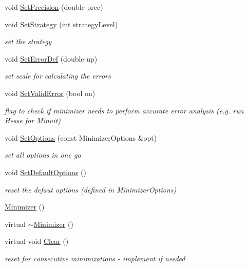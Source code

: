 \begin{DoxyCompactItemize}
void \mbox{\hyperlink{classROOT_1_1Math_1_1Minimizer_a96160fe12f3cddf6ca0668ddb4a585bc}{Set\+Precision}} (double prec)
\item 
void \mbox{\hyperlink{classROOT_1_1Math_1_1Minimizer_a86a1145e00a7912ac061bad0e11b6c0b}{Set\+Strategy}} (int strategy\+Level)
\begin{DoxyCompactList}\small\item\em set the strategy \end{DoxyCompactList}\item 
void \mbox{\hyperlink{classROOT_1_1Math_1_1Minimizer_a24e7d646b58b9d5d2778c7c0399677da}{Set\+Error\+Def}} (double up)
\begin{DoxyCompactList}\small\item\em set scale for calculating the errors \end{DoxyCompactList}\item 
void \mbox{\hyperlink{classROOT_1_1Math_1_1Minimizer_a31289e6911a86aba956d0050cee2555b}{Set\+Valid\+Error}} (bool on)
\begin{DoxyCompactList}\small\item\em flag to check if minimizer needs to perform accurate error analysis (e.\+g. run Hesse for Minuit) \end{DoxyCompactList}\item 
void \mbox{\hyperlink{classROOT_1_1Math_1_1Minimizer_ac1546eeefbfb78bcfaf6d06cfde227c5}{Set\+Options}} (const Minimizer\+Options \&opt)
\begin{DoxyCompactList}\small\item\em set all options in one go \end{DoxyCompactList}\item 
void \mbox{\hyperlink{classROOT_1_1Math_1_1Minimizer_a4811690d47537dbc0ab09d50d57ce34f}{Set\+Default\+Options}} ()
\begin{DoxyCompactList}\small\item\em reset the defaut options (defined in Minimizer\+Options) \end{DoxyCompactList}\item 
\mbox{\hyperlink{classROOT_1_1Math_1_1Minimizer_a6981643dac29da36280b24d32b6d3140}{Minimizer}} ()
\item 
virtual \mbox{\hyperlink{classROOT_1_1Math_1_1Minimizer_aa1045455fe657956659bfa7a21ce447e}{$\sim$\+Minimizer}} ()
\item 
virtual void \mbox{\hyperlink{classROOT_1_1Math_1_1Minimizer_ad7308846baecf68fb0dbc2d5e4caa178}{Clear}} ()
\begin{DoxyCompactList}\small\item\em reset for consecutive minimizations -\/ implement if needed \end{DoxyCompactList}\item 

\end{DoxyCompactItemize}

